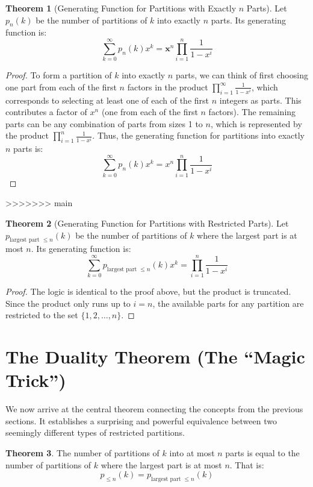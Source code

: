 \documentclass{article}
\theoremstyle{definition}
\newtheorem{theorem}{Theorem}
\begin{document}
\begin{theorem}[Generating Function for Partitions with Exactly $n$ Parts]
  Let $p_n(k)$ be the number of partitions of $k$ into exactly $n$ parts. Its generating function is:
  $$
  \sum_{k=0}^{\infty} p_n(k) x^k=\boldsymbol{x}^n \prod_{i=1}^n \frac{1}{1-x^i}
  $$
\end{theorem}
\begin{proof}
  To form a partition of $k$ into exactly $n$ parts, we can think of first choosing one part from each of the first $n$ factors in the product $\prod_{i=1}^{\infty} \frac{1}{1-x^i}$, which corresponds to selecting at least one of each of the first $n$ integers as parts. This contributes a factor of $x^n$ (one from each of the first $n$ factors). The remaining parts can be any combination of parts from sizes 1 to $n$, which is represented by the product $\prod_{i=1}^{n} \frac{1}{1-x^i}$. Thus, the generating function for partitions into exactly $n$ parts is:
  $$ \sum_{k=0}^{\infty} p_n(k) x^k = x^n \prod_{i=1}^{n} \frac{1}{1-x^i} $$  
\end{proof}


>>>>>>> main
\begin{theorem}[Generating Function for Partitions with Restricted Parts]
  Let $p_{\text{largest part } \le n}(k)$ be the number of partitions of $k$ where the largest part is at most $n$. Its generating function is:
  $$ \sum_{k=0}^{\infty} p_{\text{largest part } \le n}(k)x^k = \prod_{i=1}^{n} \frac{1}{1-x^i} $$
\end{theorem}
\begin{proof}
  The logic is identical to the proof above, but the product is truncated. Since the product only runs up to $i=n$, the available parts for any partition are restricted to the set $\{1, 2, \dots, n\}$.
\end{proof}


\section{The Duality Theorem (The ``Magic Trick'')}

We now arrive at the central theorem connecting the concepts from the previous sections. It establishes a surprising and powerful equivalence between two seemingly different types of restricted partitions.

\begin{theorem}\label{thm:duality}
  The number of partitions of $k$ into at most $n$ parts is equal to the number of partitions of $k$ where the largest part is at most $n$. That is:
  $$ p_{\le n}(k) = p_{\text{largest part } \le n}(k) $$
\end{theorem}
\end{document}
